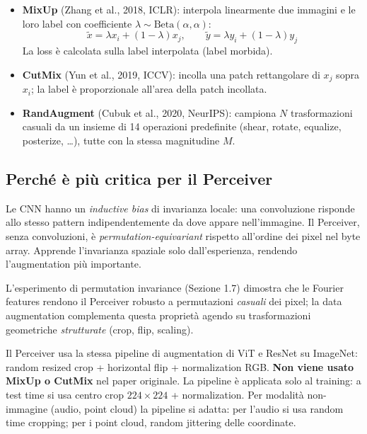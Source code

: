 \documentclass[
  11pt,
]{article}
\begin{document}
\begin{itemize}
  \item \textbf{MixUp} (Zhang et al., 2018, ICLR): interpola linearmente due immagini e le loro label con coefficiente $\lambda \sim \text{Beta}(\alpha, \alpha)$:
  \[
  \tilde{x} = \lambda x_i + (1-\lambda) x_j, \qquad \tilde{y} = \lambda y_i + (1-\lambda) y_j
  \]
  La loss è calcolata sulla label interpolata (label morbida).

  \item \textbf{CutMix} (Yun et al., 2019, ICCV): incolla una patch rettangolare di $x_j$ sopra $x_i$; la label è proporzionale all'area della patch incollata.

  \item \textbf{RandAugment} (Cubuk et al., 2020, NeurIPS): campiona $N$ trasformazioni casuali da un insieme di 14 operazioni predefinite (shear, rotate, equalize, posterize, \ldots), tutte con la stessa magnitudine $M$.
\end{itemize}

\subsection{Perché è più critica per il Perceiver}

Le CNN hanno un \emph{inductive bias} di invarianza locale: una convoluzione risponde allo stesso pattern indipendentemente da dove appare nell'immagine. Il Perceiver, senza convoluzioni, è \emph{permutation-equivariant} rispetto all'ordine dei pixel nel byte array. Apprende l'invarianza spaziale solo dall'esperienza, rendendo l'augmentation più importante.

L'esperimento di permutation invariance (Sezione 1.7) dimostra che le Fourier features rendono il Perceiver robusto a permutazioni \emph{casuali} dei pixel; la data augmentation complementa questa proprietà agendo su trasformazioni geometriche \emph{strutturate} (crop, flip, scaling).

\begin{notabox}[title={\textbf{Collegamento al Perceiver}}]
Il Perceiver usa la stessa pipeline di augmentation di ViT e ResNet su ImageNet: random resized crop + horizontal flip + normalization RGB. \textbf{Non viene usato MixUp o CutMix} nel paper originale. La pipeline è applicata solo al training: a test time si usa centro crop $224\times224$ + normalization. Per modalità non-immagine (audio, point cloud) la pipeline si adatta: per l'audio si usa random time cropping; per i point cloud, random jittering delle coordinate.
\end{notabox}
\end{document}
